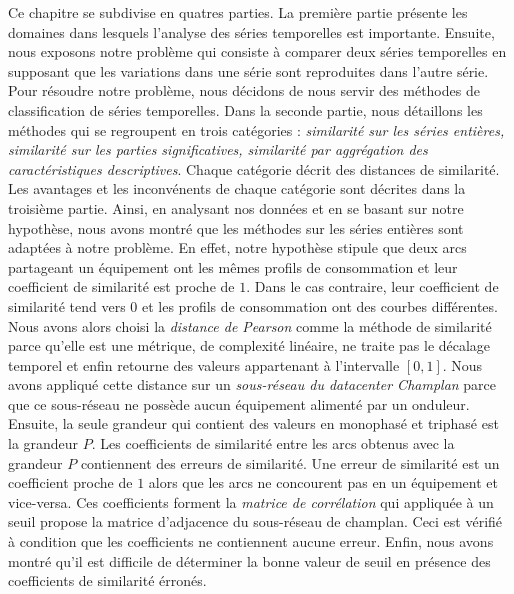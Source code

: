 Ce chapitre se subdivise en quatres parties.
La premi\`ere partie pr\'esente les domaines dans lesquels l'analyse des s\'eries temporelles est importante. Ensuite, nous exposons notre probl\`eme qui consiste \`a comparer deux s\'eries temporelles en supposant que les variations dans une s\'erie sont reproduites dans l'autre s\'erie.
Pour r\'esoudre notre probl\`eme, nous d\'ecidons de nous servir des m\'ethodes de classification de s\'eries temporelles.
Dans la seconde partie, nous d\'etaillons les m\'ethodes qui se regroupent en trois cat\'egories :
{\em similarit\'e sur les s\'eries enti\`eres, similarit\'e sur les parties significatives, similarit\'e par aggr\'egation des caract\'eristiques descriptives}. Chaque cat\'egorie d\'ecrit des distances de similarit\'e. 
Les avantages et les inconv\'enents de chaque cat\'egorie sont d\'ecrites dans la troisi\`eme partie. Ainsi, en analysant nos donn\'ees et en se basant sur notre hypoth\`ese, nous avons montr\'e que  les m\'ethodes sur les s\'eries enti\`eres sont adapt\'ees \`a notre probl\`eme.
En effet, notre hypoth\`ese stipule que deux arcs partageant un \'equipement ont les m\^emes profils de consommation et leur coefficient de similarit\'e est proche de $1$. Dans le cas contraire,  leur coefficient de similarit\'e tend vers $0$ et les profils de consommation ont des courbes diff\'erentes.
Nous avons alors choisi la {\em distance de Pearson} comme la m\'ethode de similarit\'e parce qu'elle est une m\'etrique, de complexit\'e lin\'eaire, ne traite pas le d\'ecalage temporel et enfin retourne des valeurs appartenant \`a l'intervalle $[0,1]$.
Nous avons appliqu\'e cette distance sur un {\em sous-r\'eseau du datacenter Champlan} parce que ce sous-r\'eseau ne poss\`ede aucun \'equipement aliment\'e par un onduleur.
Ensuite, la seule grandeur qui contient des valeurs en monophas\'e et triphas\'e est la grandeur $P$.
Les coefficients de similarit\'e entre les arcs obtenus avec la grandeur $P$ contiennent des erreurs de similarit\'e. Une erreur de similarit\'e est un coefficient proche de $1$ alors que les arcs ne concourent pas en un \'equipement et vice-versa.
Ces coefficients forment la {\em matrice de corr\'elation} qui appliqu\'ee \`a un seuil propose la matrice d'adjacence du sous-r\'eseau de champlan. Ceci est v\'erifi\'e \`a condition que les coefficients ne contiennent aucune erreur.
Enfin, nous avons montr\'e qu'il est difficile de d\'eterminer la bonne valeur de seuil en pr\'esence des coefficients de similarit\'e \'erron\'es.